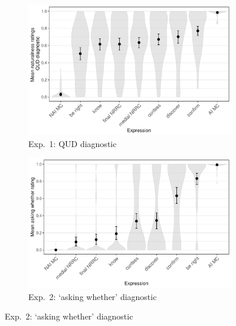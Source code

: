 \documentclass[12pt]{article}
\begin{document}
    
\begin{figure}[h!]
\centering

\begin{subfigure}{.49\textwidth}
\centering
 \includegraphics[width=1\textwidth]{../../results/main/exp1/graphs/mean-ratings.pdf}
 \caption{Exp.~1: QUD diagnostic}
 \end{subfigure} %
 \begin{subfigure}{.49\textwidth}
\centering
 \includegraphics[width=1\textwidth]{../../results/main/exp2/graphs/mean-ratings.pdf}
 \caption{Exp.~2: `asking whether' diagnostic}
 \end{subfigure}



\end{figure}
\end{document}
